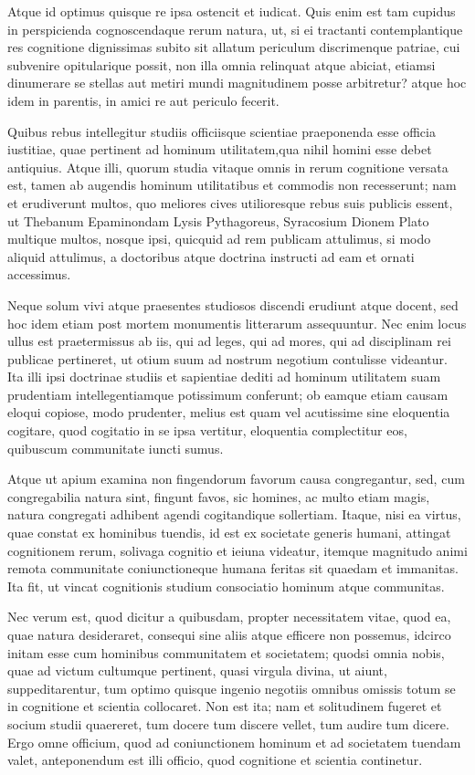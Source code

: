  Atque id optimus quisque re ipsa ostencit et iudicat. Quis enim est tam cupidus in perspicienda cognoscendaque rerum natura, ut, si ei tractanti contemplantique res cognitione dignissimas subito sit allatum periculum discrimenque patriae, cui subvenire opitularique possit, non illa omnia relinquat atque abiciat, etiamsi dinumerare se stellas aut metiri mundi magnitudinem posse arbitretur? atque hoc idem in parentis, in amici re aut periculo fecerit.

 Quibus rebus intellegitur studiis officiisque scientiae praeponenda esse officia iustitiae, quae pertinent ad hominum utilitatem,qua nihil homini esse debet antiquius. Atque illi, quorum studia vitaque omnis in rerum cognitione versata est, tamen ab augendis hominum utilitatibus et commodis non recesserunt; nam et erudiverunt multos, quo meliores cives utilioresque rebus suis publicis essent, ut Thebanum Epaminondam Lysis Pythagoreus, Syracosium Dionem Plato multique multos, nosque ipsi, quicquid ad rem publicam attulimus, si modo aliquid attulimus, a doctoribus atque doctrina instructi ad eam et ornati accessimus.

 Neque solum vivi atque praesentes studiosos discendi erudiunt atque docent, sed hoc idem etiam post mortem monumentis litterarum assequuntur. Nec enim locus ullus est praetermissus ab iis, qui ad leges, qui ad mores, qui ad disciplinam rei publicae pertineret, ut otium suum ad nostrum negotium contulisse videantur. Ita illi ipsi doctrinae studiis et sapientiae dediti ad hominum utilitatem suam prudentiam intellegentiamque potissimum conferunt; ob eamque etiam causam eloqui copiose, modo prudenter, melius est quam vel acutissime sine eloquentia cogitare, quod cogitatio in se ipsa vertitur, eloquentia complectitur eos, quibuscum communitate iuncti sumus.

 Atque ut apium examina non fingendorum favorum causa congregantur, sed, cum congregabilia natura sint, fingunt favos, sic homines, ac multo etiam magis, natura congregati adhibent agendi cogitandique sollertiam. Itaque, nisi ea virtus, quae constat ex hominibus tuendis, id est ex societate generis humani, attingat cognitionem rerum, solivaga cognitio et ieiuna videatur, itemque magnitudo animi remota communitate coniunctioneque humana feritas sit quaedam et immanitas. Ita fit, ut vincat cognitionis studium consociatio hominum atque communitas.

 Nec verum est, quod dicitur a quibusdam, propter necessitatem vitae, quod ea, quae natura desideraret, consequi sine aliis atque efficere non possemus, idcirco initam esse cum hominibus communitatem et societatem; quodsi omnia nobis, quae ad victum cultumque pertinent, quasi virgula divina, ut aiunt, suppeditarentur, tum optimo quisque ingenio negotiis omnibus omissis totum se in cognitione et scientia collocaret. Non est ita; nam et solitudinem fugeret et socium studii quaereret, tum docere tum discere vellet, tum audire tum dicere. Ergo omne officium, quod ad coniunctionem hominum et ad societatem tuendam valet, anteponendum est illi officio, quod cognitione et scientia continetur.

